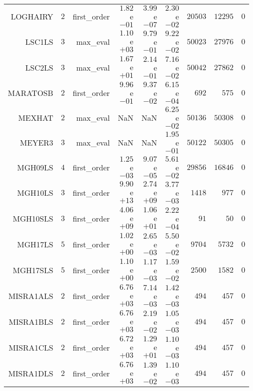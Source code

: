\begin{longtable}{rrrrrrrrr}
LOGHAIRY & \(     2\) & first\_order & \( 1.82\)e\(-01\) & \( 3.99\)e\(-07\) & \( 2.30\)e\(-02\) & \( 20503\) & \( 12295\) & \(     0\) \\
LSC1LS & \(     3\) & max\_eval & \( 1.10\)e\(+03\) & \( 9.79\)e\(-01\) & \( 9.22\)e\(-02\) & \( 50023\) & \( 27976\) & \(     0\) \\
LSC2LS & \(     3\) & max\_eval & \( 1.67\)e\(+01\) & \( 2.14\)e\(-01\) & \( 7.16\)e\(-02\) & \( 50042\) & \( 27862\) & \(     0\) \\
MARATOSB & \(     2\) & first\_order & \( 9.96\)e\(-01\) & \( 9.37\)e\(-02\) & \( 6.15\)e\(-04\) & \(   692\) & \(   575\) & \(     0\) \\
MEXHAT & \(     2\) & max\_eval &       NaN &       NaN & \( 6.25\)e\(-02\) & \( 50136\) & \( 50308\) & \(     0\) \\
MEYER3 & \(     3\) & max\_eval &       NaN &       NaN & \( 1.95\)e\(-01\) & \( 50122\) & \( 50305\) & \(     0\) \\
MGH09LS & \(     4\) & first\_order & \( 1.25\)e\(-03\) & \( 9.07\)e\(-05\) & \( 5.61\)e\(-02\) & \( 29856\) & \( 16846\) & \(     0\) \\
MGH10LS & \(     3\) & first\_order & \( 9.90\)e\(+13\) & \( 2.74\)e\(+09\) & \( 3.77\)e\(-03\) & \(  1418\) & \(   977\) & \(     0\) \\
MGH10SLS & \(     3\) & first\_order & \( 4.06\)e\(+09\) & \( 1.06\)e\(+01\) & \( 2.22\)e\(-04\) & \(    91\) & \(    50\) & \(     0\) \\
MGH17LS & \(     5\) & first\_order & \( 1.02\)e\(+00\) & \( 2.65\)e\(-03\) & \( 5.50\)e\(-02\) & \(  9704\) & \(  5732\) & \(     0\) \\
MGH17SLS & \(     5\) & first\_order & \( 1.10\)e\(+00\) & \( 1.17\)e\(-03\) & \( 1.59\)e\(-02\) & \(  2500\) & \(  1582\) & \(     0\) \\
MISRA1ALS & \(     2\) & first\_order & \( 6.76\)e\(+03\) & \( 7.14\)e\(-03\) & \( 1.42\)e\(-03\) & \(   494\) & \(   457\) & \(     0\) \\
MISRA1BLS & \(     2\) & first\_order & \( 6.76\)e\(+03\) & \( 2.19\)e\(-02\) & \( 1.05\)e\(-03\) & \(   494\) & \(   457\) & \(     0\) \\
MISRA1CLS & \(     2\) & first\_order & \( 6.72\)e\(+03\) & \( 1.29\)e\(+01\) & \( 1.10\)e\(-03\) & \(   494\) & \(   457\) & \(     0\) \\
MISRA1DLS & \(     2\) & first\_order & \( 6.76\)e\(+03\) & \( 1.39\)e\(-02\) & \( 1.10\)e\(-03\) & \(   494\) & \(   457\) & \(     0\) \\

\end{longtable}
